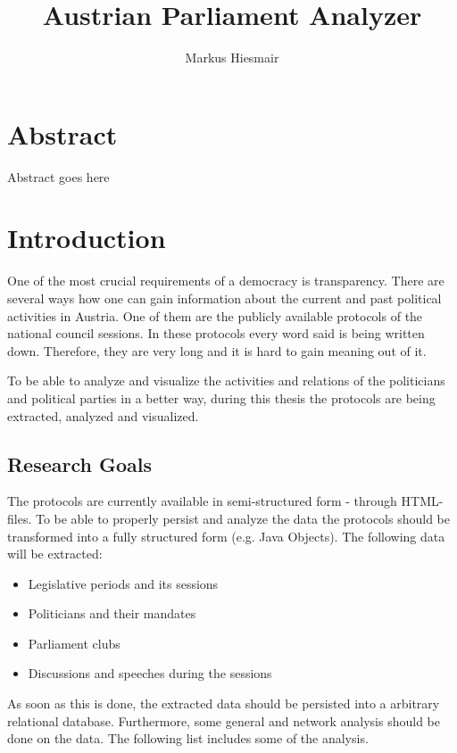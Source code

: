 \documentclass[12pt]{report}
\title{Austrian Parliament Analyzer}
\author{Markus Hiesmair}
\begin{document}
\maketitle
\newpage

\chapter*{Abstract}
Abstract goes here

\tableofcontents


\chapter{Introduction}
One of the most crucial requirements of a democracy is transparency. There are several ways how one can gain information about the current and past political activities in Austria. One of them are the publicly available protocols of the national council sessions. In these protocols every word said is being written down. Therefore, they are very long and it is hard to gain meaning out of it.

To be able to analyze and visualize the activities and relations of the politicians and political parties in a better way, during this thesis the protocols are being extracted, analyzed and visualized. 

\section{Research Goals}
The protocols are currently available in semi-structured form - through HTML-files. To be able to properly persist and analyze the data the protocols should be transformed into a fully structured form (e.g. Java Objects). The following data will be extracted:

\begin{itemize}
  \item Legislative periods and its sessions
  \item Politicians and their mandates
  \item Parliament clubs
  \item Discussions and speeches during the sessions
\end{itemize}

As soon as this is done, the extracted data should be persisted into a arbitrary relational database. Furthermore, some general and network analysis should be done on the data. The following list includes some of the analysis.
\end{document}

